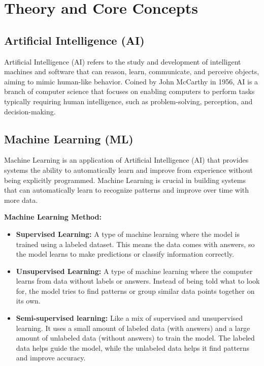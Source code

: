 \documentclass[12pt,oneside,openright,a4paper]{cpe-english-project}
\begin{document}
\section{Theory and Core Concepts}
\subsection{Artificial Intelligence (AI)}
Artificial Intelligence (AI) refers to the study and development of intelligent machines and software that can reason, learn, communicate, and perceive objects, aiming to mimic human-like behavior. Coined by John McCarthy in 1956, AI is a branch of computer science that focuses on enabling computers to perform tasks typically requiring human intelligence, such as problem-solving, perception, and decision-making.

\subsection{Machine Learning (ML)}
Machine Learning is an application of Artificial Intelligence (AI) that provides systems the ability to automatically learn and improve from experience without being explicitly programmed. Machine Learning is crucial in building systems that can automatically learn to recognize patterns and improve over time with more data.

\textbf{Machine Learning Method:}
\begin{itemize}
    \item \textbf{Supervised Learning:} A type of machine learning where the model is trained using a labeled dataset. This means the data comes with answers, so the model learns to make predictions or classify information correctly.
 
    \item \textbf{Unsupervised Learning:} A type of machine learning where the computer learns from data without labels or answers. Instead of being told what to look for, the model tries to find patterns or group similar data points together on its own.
    
    \item \textbf{Semi-supervised learning:} Like a mix of supervised and unsupervised learning. It uses a small amount of labeled data (with answers) and a large amount of unlabeled data (without answers) to train the model. The labeled data helps guide the model, while the unlabeled data helps it find patterns and improve accuracy.
\end{itemize}
\end{document}
